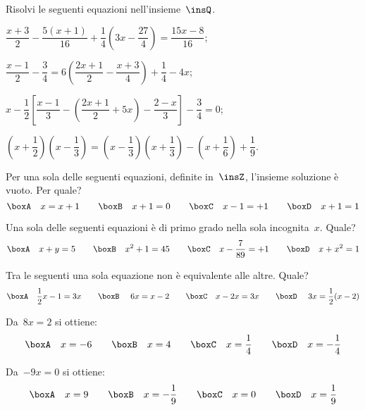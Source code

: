 \pagebreak

\begin{esercizio}[\Ast]
\label{ese:15.43}
Risolvi le seguenti equazioni nell'insieme~$\insQ$.
\begin{enumeratea}
 \item $\dfrac{x+3}{2}-\dfrac{5(x+1)}{16}+\dfrac{1}{4}\left(3x-\dfrac{27}{4}\right)=\dfrac{15x-8}{16}$;
 \item $\dfrac{x-1}{2}-\dfrac{3}{4}=6\left(\dfrac{2x+1}{2}-\dfrac{x+3}{4}\right)+\dfrac{1}{4}-4x$;
 \item $x-\dfrac{1}{2}\left[\dfrac{x-1}{3}-\left(\dfrac{2x+1}{2}+5x\right)-\dfrac{2-x}{3}\right]-\dfrac{3}{4}=0$;
 \item $\left(x+\dfrac{1}{2}\right)\left(x-\dfrac{1}{3}\right)=\left(x-\dfrac{1}{3}\right)\left(x+\dfrac{1}{3}\right)-\left(x+\dfrac{1}{6}\right)+\dfrac{1}{9}$.
\end{enumeratea}
\end{esercizio}

\begin{esercizio}
\label{ese:15.44}
Per una sola delle seguenti equazioni, definite in~$\insZ$, l'insieme soluzione è vuoto. Per quale?
\[\boxA\quad x=x+1\qquad\boxB\quad x+1=0\qquad\boxC\quad x-1=+1\qquad\boxD\quad x+1=1\]
\end{esercizio}

\begin{esercizio}
\label{ese:15.45}
Una sola delle seguenti equazioni è di primo grado nella sola incognita~$x$. Quale?
\[\boxA\quad x+y=5\qquad\boxB\quad x^{2}+1=45\qquad\boxC\quad x-\dfrac{7}{89}=+1\qquad\boxD\quad x+x^{2}=1\]
\end{esercizio}

\begin{esercizio}
\label{ese:15.46}
Tra le seguenti una sola equazione non è equivalente alle altre. Quale?
\[\boxA\quad \dfrac{1}{2}x-1=3x\qquad\boxB\quad~6x=x-2\qquad\boxC\quad x-2x=3x\qquad\boxD\quad~3x=\dfrac{1}{2}(x-2)\]
\end{esercizio}

\begin{esercizio}
\label{ese:15.47}
Da~$8x=2$ si ottiene:
\[\boxA\quad x=-6\qquad\boxB\quad x=4\qquad\boxC\quad x=\dfrac{1}{4}\qquad\boxD\quad x=-{\dfrac{1}{4}}\]
\end{esercizio}

\begin{esercizio}
\label{ese:15.48}
Da~$-9x=0$ si ottiene:
\[\boxA\quad x=9\qquad\boxB\quad x=-{\dfrac{1}{9}}\qquad\boxC\quad x=0\qquad\boxD\quad x=\dfrac{1}{9}\]
\end{esercizio}

